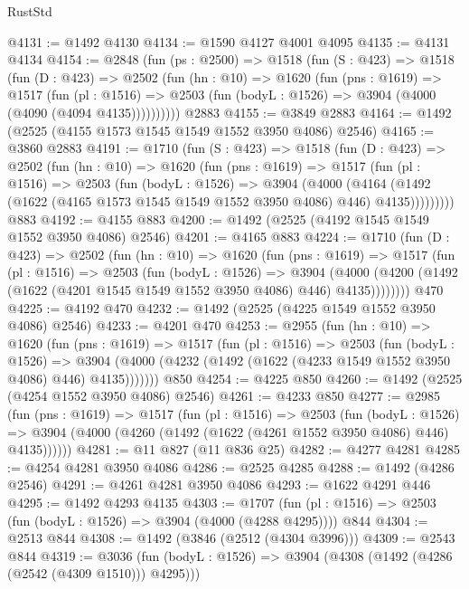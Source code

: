 \begin{lexlean}{RustStd}
\begin{coremodule}
@4131 := @1492 @4130
@4134 := @1590 @4127 @4001 @4095
@4135 := @4131 @4134
@4154 := @2848
    (fun (ps : @2500) =>
    @1518
      (fun (S : @423) =>
      @1518
        (fun (D : @423) =>
        @2502
          (fun (hn : @10) =>
          @1620
            (fun (pns : @1619) =>
            @1517
              (fun (pl : @1516) =>
              @2503 (fun (bodyL : @1526) => @3904 (@4000 (@4090 (@4094 @4135))))))))))
    @2883
@4155 := @3849 @2883
@4164 := @1492 (@2525 (@4155 @1573 @1545 @1549 @1552 @3950 @4086) @2546)
@4165 := @3860 @2883
@4191 := @1710
    (fun (S : @423) =>
    @1518
      (fun (D : @423) =>
      @2502
        (fun (hn : @10) =>
        @1620
          (fun (pns : @1619) =>
          @1517
            (fun (pl : @1516) =>
            @2503
              (fun (bodyL : @1526) =>
              @3904
                (@4000
                  (@4164
                    (@1492 (@1622 (@4165 @1573 @1545 @1549 @1552 @3950 @4086) @446) @4135)))))))))
    @883
@4192 := @4155 @883
@4200 := @1492 (@2525 (@4192 @1545 @1549 @1552 @3950 @4086) @2546)
@4201 := @4165 @883
@4224 := @1710
    (fun (D : @423) =>
    @2502
      (fun (hn : @10) =>
      @1620
        (fun (pns : @1619) =>
        @1517
          (fun (pl : @1516) =>
          @2503
            (fun (bodyL : @1526) =>
            @3904
              (@4000 (@4200 (@1492 (@1622 (@4201 @1545 @1549 @1552 @3950 @4086) @446) @4135))))))))
    @470
@4225 := @4192 @470
@4232 := @1492 (@2525 (@4225 @1549 @1552 @3950 @4086) @2546)
@4233 := @4201 @470
@4253 := @2955
    (fun (hn : @10) =>
    @1620
      (fun (pns : @1619) =>
      @1517
        (fun (pl : @1516) =>
        @2503
          (fun (bodyL : @1526) =>
          @3904 (@4000 (@4232 (@1492 (@1622 (@4233 @1549 @1552 @3950 @4086) @446) @4135)))))))
    @850
@4254 := @4225 @850
@4260 := @1492 (@2525 (@4254 @1552 @3950 @4086) @2546)
@4261 := @4233 @850
@4277 := @2985
    (fun (pns : @1619) =>
    @1517
      (fun (pl : @1516) =>
      @2503
        (fun (bodyL : @1526) =>
        @3904 (@4000 (@4260 (@1492 (@1622 (@4261 @1552 @3950 @4086) @446) @4135))))))
@4281 := @11 @827 (@11 @836 @25)
@4282 := @4277 @4281
@4285 := @4254 @4281 @3950 @4086
@4286 := @2525 @4285
@4288 := @1492 (@4286 @2546)
@4291 := @4261 @4281 @3950 @4086
@4293 := @1622 @4291 @446
@4295 := @1492 @4293 @4135
@4303 := @1707 (fun (pl : @1516) => @2503 (fun (bodyL : @1526) => @3904 (@4000 (@4288 @4295)))) @844
@4304 := @2513 @844
@4308 := @1492 (@3846 (@2512 (@4304 @3996)))
@4309 := @2543 @844
@4319 := @3036
    (fun (bodyL : @1526) => @3904 (@4308 (@1492 (@4286 (@2542 (@4309 @1510))) @4295)))

\end{coremodule}
\end{lexlean}
